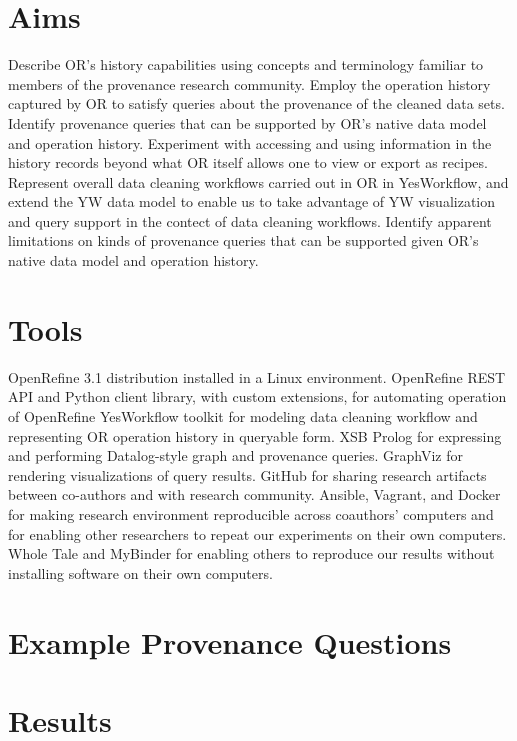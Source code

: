 \documentclass[sigconf,screen,nonacm]{acmart}
\begin{document}
\section{Aims}

Describe OR's history capabilities using concepts and terminology familiar to members of the provenance research community.
Employ the operation history captured by OR to satisfy queries about the provenance of the cleaned data sets.
Identify provenance queries that can be supported by OR's native data model and operation history. 
Experiment with accessing and using information in the history records beyond what OR itself allows one to view or export as recipes.
Represent overall data cleaning workflows carried out in OR in YesWorkflow, and extend the YW data model to enable us to take advantage of YW visualization and query support in the contect of data cleaning workflows.
Identify apparent limitations on kinds of provenance queries that can be supported given OR's native data model and operation history. 

\section{Tools}

OpenRefine 3.1 distribution installed in a Linux environment.
OpenRefine REST API and Python client library, with custom extensions, for automating operation of OpenRefine
YesWorkflow toolkit for modeling data cleaning workflow and representing OR operation history in queryable form.
XSB Prolog for expressing and performing Datalog-style graph and provenance queries.
GraphViz for rendering visualizations of query results.
GitHub for sharing research artifacts between co-authors and with research community.
Ansible, Vagrant, and Docker for making research environment reproducible across coauthors' computers and for enabling other researchers to repeat our experiments on their own computers.
Whole Tale and MyBinder for enabling others to reproduce our results without installing software on their own computers. 

\section{Example Provenance Questions}

\section{Results}
\end{document}
